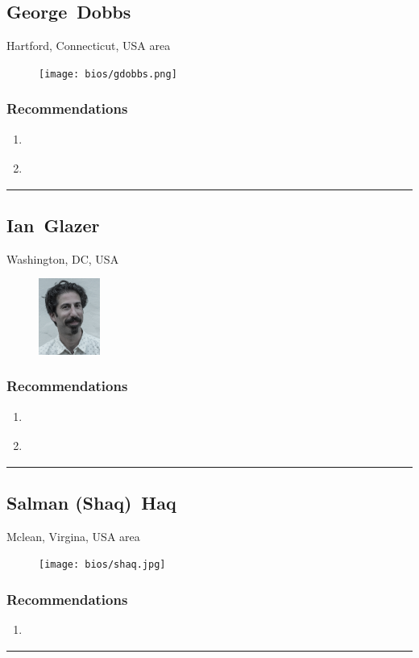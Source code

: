 \subsection{George~Dobbs} \textsf{Hartford, Connecticut, USA area} \par \setlength{\columnsep}{0pt} \begin{figure} \centering \texttt{[image: bios/gdobbs.png]} \end{figure}  \subsubsection{Recommendations}\begin{enumerate}
\item \cite{Cameron2005}
\item \cite{Hoffman1977}
\end{enumerate}\noindent\rule{\textwidth}{0.2pt}

\subsection{Ian~Glazer} \textsf{Washington, DC, USA} \par \setlength{\columnsep}{0pt} \begin{figure} \centering \includegraphics[width=0.18\textwidth]{bios/iglazer.jpg} \end{figure}  \subsubsection{Recommendations}\begin{enumerate}
\item \cite{Clippinger2007}
\item \cite{Richer2017}
\end{enumerate}\noindent\rule{\textwidth}{0.2pt}

\subsection{Salman (Shaq)~Haq} \textsf{Mclean, Virgina, USA area} \par \setlength{\columnsep}{0pt} \begin{figure} \centering \texttt{[image: bios/shaq.jpg]} \end{figure}  \subsubsection{Recommendations}\begin{enumerate}
\item \cite{Windley2005}
\end{enumerate}\noindent\rule{\textwidth}{0.2pt}

